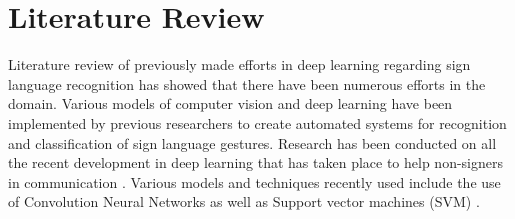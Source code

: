 \chapter{Literature Review}

Literature review of previously made efforts in deep learning regarding sign language recognition has showed that there have been numerous efforts in the domain. Various models of computer vision and deep learning have been implemented by previous researchers to create automated systems for recognition and classification of sign language gestures. Research has been conducted on all the recent development in deep learning that has taken place to help non-signers in communication \cite{panneer2022recent}. Various models and techniques recently used include the use of Convolution Neural Networks \cite{mannan2022hypertuned, rahman2019new} as well as Support vector machines (SVM) \cite{katoch2022indian}. 